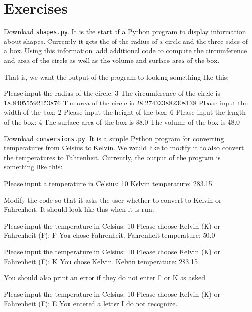 \documentclass[11pt]{cselabheader}
\begin{document}
\pagebreak
\section{Exercises}

\begin{ex}[shapes.py] Download \texttt{shapes.py}. It is the start of a Python
  program to display information about shapes. Currently it gets the of the
  radius of a circle and the three sides of a box. Using this information, add
  additional code to compute the circumference and area of the circle as well as
  the volume and surface area of the box.

  That is, we want the output of the program to looking something like this:

  \begin{verbatimcode}
Please input the radius of the circle: 3
The circumference of the circle is 18.84955592153876
The area of the circle is 28.274333882308138
Please input the width of the box: 2
Please input the height of the box: 6
Please input the length of the box: 4
The surface area of the box is 88.0
The volume of the box is 48.0
  \end{verbatimcode}
\end{ex}

\begin{ex}[conversions.py] Download \texttt{conversions.py}. It is a simple
  Python program for converting temperatures from Celsius to Kelvin. We would
  like to modify it to also convert the temperatures to Fahrenheit. Currently,
  the output of the program is something like this:

  \begin{verbatimcode}
Please input a temperature in Celsius: 10
Kelvin temperature: 283.15
  \end{verbatimcode}

  Modify the code so that it asks the user whether to convert to Kelvin or
  Fahrenheit. It should look like this when it is run:

    \begin{verbatimcode}
Please input the temperature in Celsius: 10
Please choose Kelvin (K) or Fahrenheit (F): F
You chose Fahrenheit.
Fahrenheit temperature: 50.0
    \end{verbatimcode}

    \begin{verbatimcode}
Please input the temperature in Celsius: 10
Please choose Kelvin (K) or Fahrenheit (F): K
You chose Kelvin.
Kelvin temperature: 283.15
    \end{verbatimcode}
    
    You should also print an error if they do not enter F or K as asked:

    \begin{verbatimcode}
Please input the temperature in Celsius: 10
Please choose Kelvin (K) or Fahrenheit (F): E
You entered a letter I do not recognize.
    \end{verbatimcode}
\end{ex}
\end{document}
